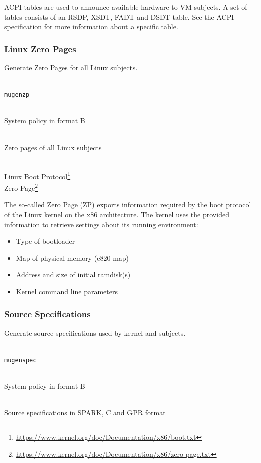 \documentclass[a4paper,twoside,titlepage]{article}
\begin{document}
ACPI tables are used to announce available hardware to VM subjects. A set of
tables consists of an RSDP, XSDT, FADT and DSDT table. See the ACPI
specification for more information about a specific table.

\subsubsection{Linux Zero Pages}
Generate Zero Pages for all Linux subjects.

\begin{description} \itemsep1pt \parskip0pt
	\item[Name] \hfill \\
		\texttt{mugenzp}
	\item[Input] \hfill \\
		System policy in format B
	\item[Output] \hfill \\
		Zero pages of all Linux subjects
	\item[Output format] \hfill \\
		Linux Boot Protocol\footnote{\url{https://www.kernel.org/doc/Documentation/x86/boot.txt}} \\
		Zero Page\footnote{\url{https://www.kernel.org/doc/Documentation/x86/zero-page.txt}}
\end{description}

The so-called Zero Page (ZP) exports information required by the boot protocol
of the Linux kernel on the x86 architecture. The kernel uses the provided
information to retrieve settings about its running environment:
\begin{itemize}
	\item Type of bootloader
	\item Map of physical memory (e820 map)
	\item Address and size of initial ramdisk(s)
	\item Kernel command line parameters
\end{itemize}

\subsubsection{Source Specifications}
\label{sec:tools-gen-spec}
Generate source specifications used by kernel and subjects.

\begin{description} \itemsep1pt \parskip0pt
	\item[Name] \hfill \\
		\texttt{mugenspec}
	\item[Input] \hfill \\
		System policy in format B
	\item[Output] \hfill \\
		Source specifications in SPARK, C and GPR format
\end{description}
\end{document}
